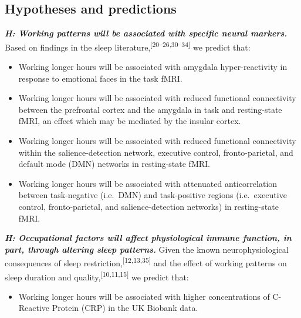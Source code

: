 \documentclass[
  english,
  man, donotrepeattitle]{apa6}
\providecommand{\tightlist}{%
  \setlength{\itemsep}{0pt}\setlength{\parskip}{0pt}}
\begin{document}
\newpage

\hypertarget{hypotheses-and-predictions}{%
\subsection{Hypotheses and predictions}\label{hypotheses-and-predictions}}

\textbf{\emph{H: Working patterns will be associated with specific neural markers.}} Based on findings in the sleep literature,\textsuperscript{{[}20--26,30--34{]}} we predict that:

\begin{itemize}
\item
  Working longer hours will be associated with amygdala hyper-reactivity in response to emotional faces in the task fMRI.
\item
  Working longer hours will be associated with reduced functional connectivity between the prefrontal cortex and the amygdala in task and resting-state fMRI, an effect which may be mediated by the insular cortex.
\item
  Working longer hours will be associated with reduced functional connectivity within the salience-detection network, executive control, fronto-parietal, and default mode (DMN) networks in resting-state fMRI.
\item
  Working longer hours will be associated with attenuated anticorrelation between task-negative (i.e.~DMN) and task-positive regions (i.e.~executive control, fronto-parietal, and salience-detection networks) in resting-state fMRI.
\end{itemize}

\hspace{1cm}

\textbf{\emph{H: Occupational factors will affect physiological immune function, in part, through altering sleep patterns.}} Given the known neurophysiological consequences of sleep restriction,\textsuperscript{{[}12,13,35{]}} and the effect of working patterns on sleep duration and quality,\textsuperscript{{[}10,11,15{]}} we predict that:

\begin{itemize}
\tightlist
\item
  Working longer hours will be associated with higher concentrations of C-Reactive Protein (CRP) in the UK Biobank data.
\end{itemize}

\hspace{1cm}
\end{document}
